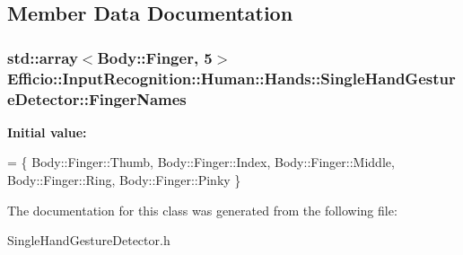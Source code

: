 \subsection{Member Data Documentation}
\subsubsection[{\texorpdfstring{Finger\+Names}{FingerNames}}]{\setlength{\rightskip}{0pt plus 5cm}std\+::array$<$Body\+::\+Finger, 5$>$ Efficio\+::\+Input\+Recognition\+::\+Human\+::\+Hands\+::\+Single\+Hand\+Gesture\+Detector\+::\+Finger\+Names\hspace{0.3cm}{\ttfamily [protected]}}\hypertarget{class_efficio_1_1_input_recognition_1_1_human_1_1_hands_1_1_single_hand_gesture_detector_a1dda643bda61df03535396dd659acb91}{}\label{class_efficio_1_1_input_recognition_1_1_human_1_1_hands_1_1_single_hand_gesture_detector_a1dda643bda61df03535396dd659acb91}
{\bfseries Initial value\+:}
\begin{DoxyCode}
= 
                    \{ 
                        Body::Finger::Thumb,
                        Body::Finger::Index,
                        Body::Finger::Middle, 
                        Body::Finger::Ring,
                        Body::Finger::Pinky
                    \}
\end{DoxyCode}


The documentation for this class was generated from the following file\+:\begin{DoxyCompactItemize}
\item 
Single\+Hand\+Gesture\+Detector.\+h\end{DoxyCompactItemize}
